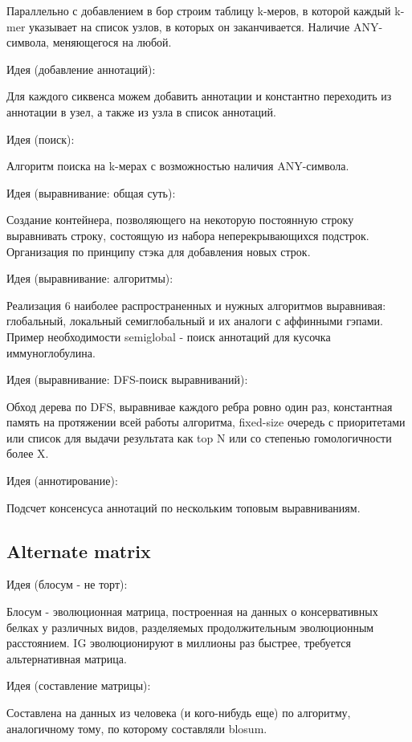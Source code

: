 \documentclass[a4paper,12pt]{article}
\begin{document}
  Параллельно с добавлением в бор строим таблицу k-меров, в которой
  каждый k-mer указывает на список узлов, в которых он
  заканчивается. Наличие ANY-символа, меняющегося на любой.

  Идея (добавление аннотаций):

  Для каждого сиквенса можем добавить аннотации и константно
  переходить из аннотации в узел, а также из узла в список аннотаций.

  Идея (поиск):

  Алгоритм поиска на k-мерах с возможностью наличия ANY-символа.

  Идея (выравнивание: общая суть):

  Создание контейнера, позволяющего на некоторую постоянную строку
  выравнивать строку, состоящую из набора неперекрывающихся
  подстрок. Организация по принципу стэка для добавления новых строк.

  Идея (выравнивание: алгоритмы):

  Реализация 6 наиболее распространенных и нужных алгоритмов
  выравнивая: глобальный, локальный семиглобальный и их аналоги с
  аффинными гэпами.
  Пример необходимости semiglobal - поиск аннотаций для кусочка
  иммуноглобулина.

  Идея (выравнивание: DFS-поиск выравниваний):

  Обход дерева по DFS, выравнивае каждого ребра ровно один раз,
  константная память на протяжении всей работы алгоритма, fixed-size очередь с
  приоритетами или список для выдачи результата как top N или со
  степенью гомологичности более X.

  Идея (аннотирование):

  Подсчет консенсуса аннотаций по нескольким топовым выравниваниям.

  \subsection{Alternate matrix}

  Идея (блосум - не торт):

  Блосум - эволюционная матрица, построенная на данных о
  консервативных белках у различных видов, разделяемых продолжительным
  эволюционным расстоянием. IG эволюционируют в миллионы раз быстрее,
  требуется альтернативная матрица.

  Идея (составление матрицы):

  Составлена на данных из человека (и кого-нибудь еще) по алгоритму,
  аналогичному тому, по которому составляли blosum.
\end{document}
